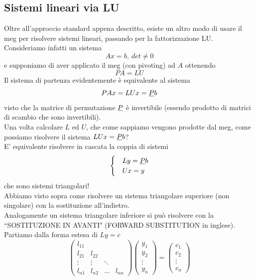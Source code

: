 \subsection{Sistemi lineari via LU}
Oltre all'approccio standard appena descritto, esiste un altro modo di usare il meg per risolvere sistemi lineari, passando per la fattorizzazione LU. \\
Consideriamo infatti un sistema
\begin{equation*}
    Ax=b, \ det \neq 0
\end{equation*}
e supponiamo di aver applicato il meg (con pivoting) ad $A$ ottenendo
\begin{equation*}
    PA = LU
\end{equation*}
Il sistema di partenza evidentemente è equivalente al sistema
\begin{equation*}
    PAx=LUx=\uline{P}b
\end{equation*}
visto che la matrice di permutazione $\uline{P}$ è invertibile (essendo prodotto di matrici di scambio che sono invertibili). \\
Una volta calcolare $L$ ed $U$, che come sappiamo vengono prodotte dal meg, come possiamo risolvere il sistema $LUx=\uline{P}b$?\\
E' equivalente risolvere in cascata la coppia di sistemi
\begin{equation*}
    \begin{cases}
         & Ly = \uline{P}b \\
         & Ux = y
    \end{cases}
\end{equation*}
che sono sistemi triangolari! \\
Abbiamo visto sopra come risolvere un sistema triangolare superiore (non singolare) con la sostituzione all'indietro. \\
Analogamente un sistema triangolare inferiore si può risolvere con la ``SOSTITUZIONE IN AVANTI" (FORWARD SUBSTITUTION in inglese). \\
Partiamo dalla forma estesa di $Ly = c$
\begin{equation*}
    \begin{pmatrix}
        l_{11} & & & \\
        l_{21} & l_{22} & & \\
        \vdots & \vdots & \ddots & \\
        l_{n1} & l_{n2} & \dots & l_{nn} 
    \end{pmatrix}
    \begin{pmatrix}
        y_1\\
        y_2 \\
        \vdots \\
        y_n 
    \end{pmatrix} = 
    \begin{pmatrix}
        c_1\\
        c_2 \\
        \vdots \\
        c_n 
    \end{pmatrix}
\end{equation*}
